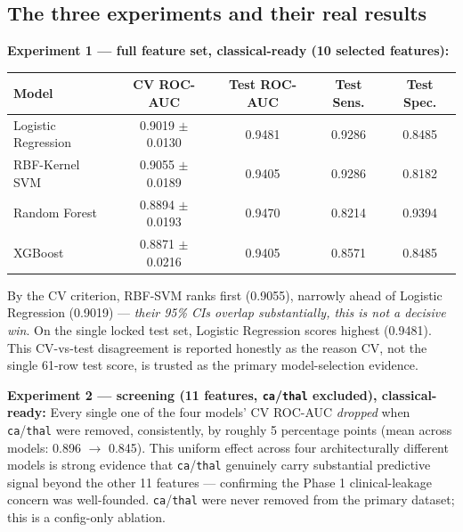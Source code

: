 \documentclass[11pt,a4paper]{article}
\newcommand{\code}[1]{\texttt{\small #1}}
\begin{document}
\subsection{The three experiments and their real results}

\textbf{Experiment 1 --- full feature set, classical-ready (10 selected features):}
\begin{center}
\small
\begin{tabular}{@{}lcccc@{}}
\toprule
\textbf{Model} & \textbf{CV ROC-AUC} & \textbf{Test ROC-AUC} & \textbf{Test Sens.} & \textbf{Test Spec.} \\
\midrule
Logistic Regression & 0.9019 $\pm$ 0.0130 & 0.9481 & 0.9286 & 0.8485 \\
RBF-Kernel SVM & 0.9055 $\pm$ 0.0189 & 0.9405 & 0.9286 & 0.8182 \\
Random Forest & 0.8894 $\pm$ 0.0193 & 0.9470 & 0.8214 & 0.9394 \\
XGBoost & 0.8871 $\pm$ 0.0216 & 0.9405 & 0.8571 & 0.8485 \\
\bottomrule
\end{tabular}
\end{center}
By the CV criterion, RBF-SVM ranks first (0.9055), narrowly ahead of Logistic Regression (0.9019) --- \emph{their 95\% CIs overlap substantially, this is not a decisive win}. On the single locked test set, Logistic Regression scores highest (0.9481). This CV-vs-test disagreement is reported honestly as the reason CV, not the single 61-row test score, is trusted as the primary model-selection evidence.

\textbf{Experiment 2 --- screening (11 features, \code{ca}/\code{thal} excluded), classical-ready:} Every single one of the four models' CV ROC-AUC \emph{dropped} when \code{ca}/\code{thal} were removed, consistently, by roughly 5 percentage points (mean across models: 0.896 $\to$ 0.845). This uniform effect across four architecturally different models is strong evidence that \code{ca}/\code{thal} genuinely carry substantial predictive signal beyond the other 11 features --- confirming the Phase 1 clinical-leakage concern was well-founded. \code{ca}/\code{thal} were never removed from the primary dataset; this is a config-only ablation.
\end{document}
